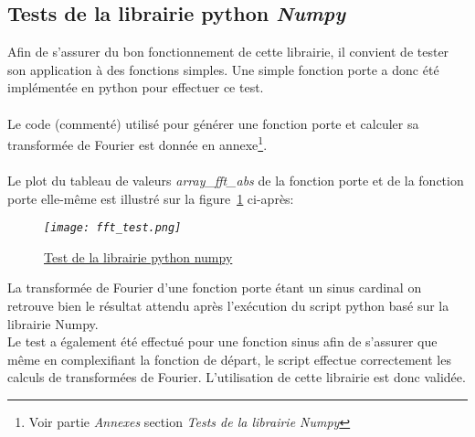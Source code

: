 \documentclass[12pt,fleqn]{book} %
\begin{document}
\subsection{Tests de la librairie python \emph{Numpy}}
Afin de s'assurer du bon fonctionnement de cette librairie, il convient de tester son application à des fonctions simples. Une simple fonction porte a donc été implémentée en python pour effectuer ce test.
~\\\\Le code (commenté) utilisé pour générer une fonction porte et calculer sa transformée de Fourier est donnée en annexe\footnote{Voir partie \emph{Annexes} section \emph{Tests de la librairie Numpy}}.
~\\\\Le plot du tableau de valeurs \emph{array\_fft\_abs} de la fonction porte et de la fonction porte elle-même est illustré sur la figure~\underline{\color{blue}\ref{fft_test}} ci-après:
\begin{figure}[H]
	\centering
	\itshape
	\texttt{[image: fft\_test.png]}
	\caption{\label{fft_test} \underline{Test de la librairie python numpy}}
\end{figure}
\noindent La transformée de Fourier d'une fonction porte étant un sinus cardinal on retrouve bien le résultat attendu après l'exécution du script python basé sur la librairie Numpy.
~\\Le test a également été effectué pour une fonction sinus afin de s'assurer que même en complexifiant la fonction de départ, le script effectue correctement les calculs de transformées de Fourier. L'utilisation de cette librairie est donc validée.
\end{document}
